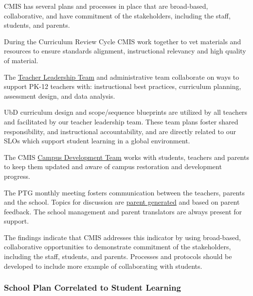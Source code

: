 \begin{findings}
CMIS has several plans and processes in place that are broad-based, collaborative, and have commitment of the stakeholders, including the staff, students, and parents.

During the Curriculum Review Cycle CMIS work together to vet materials and resources to ensure standards alignment, instructional relevancy and high quality of material.

The \href{https://docs.google.com/a/cmis.ac.th/document/d/1iW_tWIwRlWU2p0oIOvd3usDsxj9qYDt_2ROwNPBTHSc/edit?usp=sharing}{Teacher Leadership Team} and administrative team collaborate on ways to support PK-12 teachers with: instructional best practices, curriculum planning, assessment design, and data analysis. 

UbD curriculum design and scope/sequence blueprints are utilized by all teachers and facilitated by our teacher leadership team. These team plans foster shared responsibility, and instructional accountability, and are directly related to our SLOs which support student learning in a global environment. 

The CMIS \href{http://blogs.cmis.ac.th/campus/}{Campus Development Team} works with students, teachers and parents to keep them updated and aware of campus restoration and development progress.

The  PTG monthly meeting fosters communication between the teachers, parents and the school. Topics for discussion are \href{https://docs.google.com/a/cmis.ac.th/document/d/1kiwakkg8eKdtEexCxVNx-m1CfC3VqxhukDy8WXDPGKY/edit?usp=sharing}{parent generated} and based on parent feedback. The school management and parent translators are always present for support.

The findings indicate that CMIS addresses this indicator by using broad-based, collaborative opportunities to demonstrate commitment of the stakeholders, including the staff, students, and parents. Processes and protocols should be developed to include more example of collaborating with students.
\end{findings}

\subsubsection{School Plan Correlated to Student Learning}


